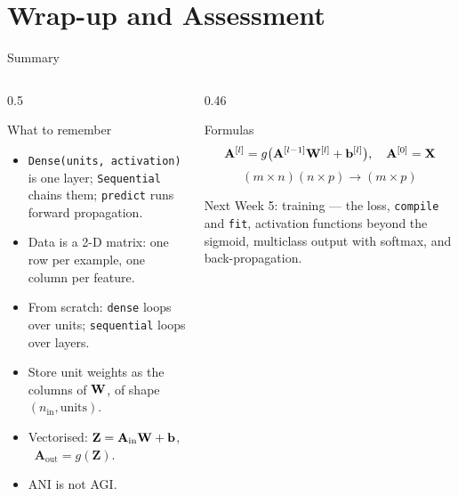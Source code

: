 \documentclass[aspectratio=169,10pt]{beamer}
\begin{document}
\section{Wrap-up and Assessment}

\begin{frame}{Summary}
  \begin{columns}[T,onlytextwidth]
    \begin{column}{0.5\textwidth}
      \begin{block}{What to remember}
        \footnotesize
        \begin{itemize}
          \item \texttt{Dense(units, activation)} is one layer; \texttt{Sequential} chains
                them; \texttt{predict} runs forward propagation.
          \item Data is a 2-D matrix: one row per example, one column per feature.
          \item From scratch: \texttt{dense} loops over units; \texttt{sequential} loops over
                layers.
          \item Store unit weights as the columns of $\mathbf{W}$, of shape
                $(n_{\text{in}},\text{units})$.
          \item Vectorised: $\mathbf{Z}=\mathbf{A}_{\text{in}}\mathbf{W}+\mathbf{b}$, \
                $\mathbf{A}_{\text{out}}=g(\mathbf{Z})$.
          \item ANI is not AGI.
        \end{itemize}
      \end{block}
    \end{column}
    \begin{column}{0.46\textwidth}
      \begin{block}{Formulas}
        \[ \mathbf{A}^{[l]} = g\bigl(\mathbf{A}^{[l-1]}\mathbf{W}^{[l]}+\mathbf{b}^{[l]}\bigr),
           \quad \mathbf{A}^{[0]}=\mathbf{X} \]
        \[ (m\times n)(n\times p)\to(m\times p) \]
      \end{block}
      \begin{block}{Next}
        \footnotesize Week 5: training --- the loss, \texttt{compile} and \texttt{fit},
        activation functions beyond the sigmoid, multiclass output with softmax, and
        back-propagation.
      \end{block}
    \end{column}
  \end{columns}
\end{frame}
\end{document}
